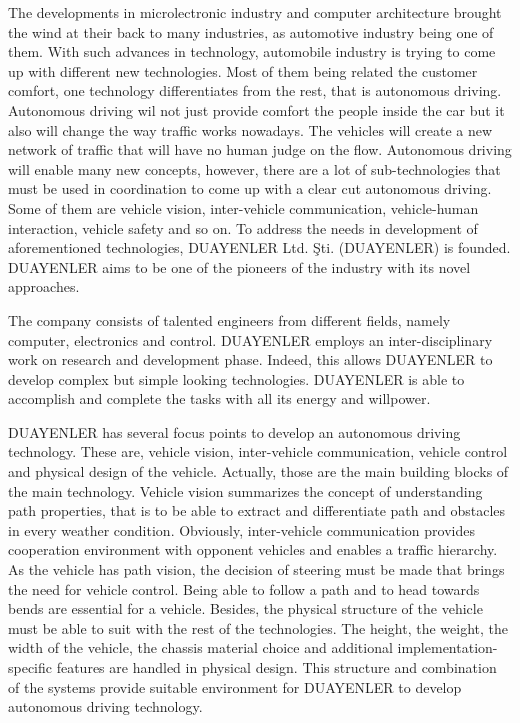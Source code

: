 \documentclass[a4paper,12pt]{article}
\begin{document}
The developments in microlectronic industry and computer architecture brought the wind at their back to many industries, as automotive industry being one of them. With such advances in technology, automobile industry is trying to come up with different new technologies. Most of them being related the customer comfort, one technology differentiates from the rest, that is autonomous driving. Autonomous driving wil not just provide comfort the people inside the car but it also will change the way traffic works nowadays. The vehicles will create a new network of traffic that will have no human judge on the flow. Autonomous driving will enable many new concepts, however, there are a lot of sub-technologies that must be used in coordination to come up with a clear cut autonomous driving. Some of them are vehicle vision, inter-vehicle communication, vehicle-human interaction, vehicle safety and so on. To address the needs in development of aforementioned technologies, DUAYENLER Ltd. Şti. (DUAYENLER) is founded. DUAYENLER aims to be one of the pioneers of the industry with its novel approaches.

The company consists of talented engineers from different fields, namely computer, electronics and control. DUAYENLER employs an inter-disciplinary work on research and development phase. Indeed, this allows DUAYENLER to develop complex but simple looking technologies. DUAYENLER is able to accomplish and complete the tasks with all its energy and willpower.

DUAYENLER has several focus points to develop an autonomous driving technology. These are, vehicle vision, inter-vehicle communication, vehicle control and physical design of the vehicle. Actually, those are the main building blocks of the main technology. Vehicle vision summarizes the concept of understanding path properties, that is to be able to extract and differentiate path and obstacles in every weather condition. Obviously, inter-vehicle communication provides cooperation environment with opponent vehicles and enables a traffic hierarchy. As the vehicle has path vision, the decision of steering must be made that brings the need for vehicle control. Being able to follow a path and to head towards bends are essential for a vehicle. Besides, the physical structure of the vehicle must be able to suit with the rest of the technologies. The height, the weight, the width of the vehicle, the chassis material choice and additional implementation-specific features are handled in physical design. This structure and combination of the systems provide suitable environment for DUAYENLER to develop autonomous driving technology.
\end{document}
